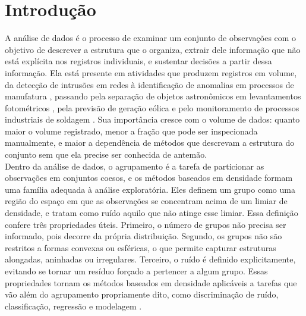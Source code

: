 
\chapter{Introdução\label{cha:intro}}

A análise de dados é o processo de examinar um conjunto de observações com o objetivo de descrever a estrutura que o organiza, extrair dele informação que não está explícita nos registros individuais, e sustentar decisões a partir dessa informação. Ela está presente em atividades que produzem registros em volume, da detecção de intrusões em redes \cite{network-intrusion-detection} à identificação de anomalias em processos de manufatura \cite{manufacturing-anomaly-detection}, passando pela separação de objetos astronômicos em levantamentos fotométricos \cite{star-galaxy-separation}, pela previsão de geração eólica \cite{wind-power-prediction} e pelo monitoramento de processos industriais de soldagem \cite{welding-curve-discovery}. Sua importância cresce com o volume de dados: quanto maior o volume registrado, menor a fração que pode ser inspecionada manualmente, e maior a dependência de métodos que descrevam a estrutura do conjunto sem que ela precise ser conhecida de antemão.\\

Dentro da análise de dados, o agrupamento é a tarefa de particionar as observações em conjuntos coesos, e os métodos baseados em densidade formam uma família adequada à análise exploratória. Eles definem um grupo como uma região do espaço em que as observações se concentram acima de um limiar de densidade, e tratam como ruído aquilo que não atinge esse limiar. Essa definição confere três propriedades úteis. Primeiro, o número de grupos não precisa ser informado, pois decorre da própria distribuição. Segundo, os grupos não são restritos a formas convexas ou esféricas, o que permite capturar estruturas alongadas, aninhadas ou irregulares. Terceiro, o ruído é definido explicitamente, evitando se tornar um resíduo forçado a pertencer a algum grupo. Essas propriedades tornam os métodos baseados em densidade aplicáveis a tarefas que vão além do agrupamento propriamente dito, como discriminação de ruído, classificação, regressão e modelagem \cite{framework-density-clustering}.\\

